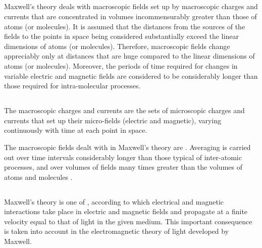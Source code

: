 \subsection{}\label{27.1.3} Maxwell's theory deals with macroscopic fields set up by macroscopic charges and currents that are concentrated in volumes incommensurably greater than those of atoms (or molecules). It is assumed that the distances from the sources of the fields to the points in space being considered substantially exceed the linear dimensions of atoms (or molecules). Therefore, macroscopic fields change appreciably only at distances that are huge compared to the linear dimensions of atoms (or molecules). Moreover, the periods of time required for changes in variable electric and magnetic fields are considered to be considerably longer than those required for intra-molecular processes.

\subsection{}\label{27.1.4} The macroscopic charges and currents are the sets of microscopic charges and currents that set up their micro-fields (electric and magnetic), varying continuously with time at each point in space.

The macroscopic fields dealt with in Maxwell's theory are . Averaging is carried out over time intervals considerably longer than those typical of inter-atomic processes, and over volumes of fields many times greater than the volumes of atoms and molecules .

\subsection{}\label{27.1.5} Maxwell's theory is one of , according to which electrical and magnetic interactions take place in electric and magnetic fields and propagate at a finite velocity equal to that of light in the given medium. This important consequence is taken into account in the electromagnetic theory of light developed by Maxwell.



